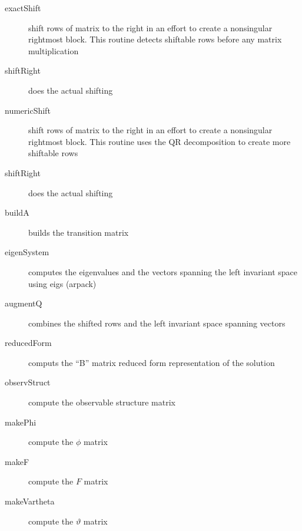 \documentclass[12pt]{article}
\begin{document}
\begin{description}
\item[exactShift] shift rows of matrix to the right in an effort to create a nonsingular rightmost block. This routine detects shiftable rows before any matrix multiplication
\item[shiftRight]  does the actual shifting 
\item[numericShift] shift rows of matrix to the right in an effort to create a nonsingular rightmost block. This routine uses the QR decomposition to create  more shiftable rows
\item[shiftRight] does the actual shifting 
\item[buildA] builds the transition matrix
\item[eigenSystem] computes the eigenvalues and the vectors spanning the left invariant space using eigs (arpack)
\item[augmentQ] combines the shifted rows and the left invariant space spanning vectors
\item[reducedForm] computs the ``B'' matrix reduced form representation of the solution
\item[observStruct] compute the observable structure matrix
\item[makePhi] compute the $\phi$ matrix
\item[makeF] compute the  $F$ matrix
\item[makeVartheta] compute the  $\vartheta$ matrix



\end{description}
\end{document}
